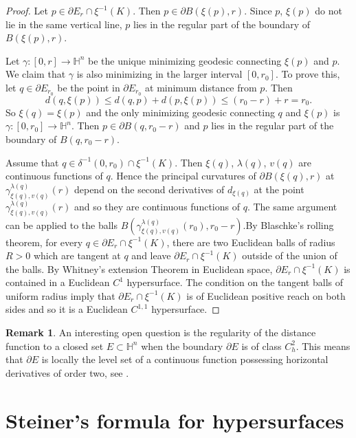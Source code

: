 \documentclass[10pt]{amsart}
\theoremstyle{definition}
\newtheorem{remark}[theorem]{Remark}
\theoremstyle{remark}
\numberwithin{equation}{section}
\begin{document}
\begin{proof}
Let $p\in{\partial} E_{r}\cap\xi^{-1}(K)$. Then $p\in{\partial} B(\xi(p),r)$. Since $p$, $\xi(p)$ do not lie in the same vertical line, $p$ lies in the regular part of the boundary of $B(\xi(p),r)$.

Let ${\gamma}:[0,r]\to{{\mathbb{H}}}^n$ be the unique minimizing geodesic connecting $\xi(p)$ and $p$. We claim that ${\gamma}$ is also minimizing in the larger interval $[0,r_{0}]$. To prove this, let $q\in {\partial} E_{r_{0}}$ be the point in ${\partial} E_{r_{0}}$ at minimum distance from $p$. Then
\[
d(q,\xi(p)){\leqslant} d(q,p)+d(p,\xi(p)){\leqslant} (r_{0}-r)+r=r_{0}.
\]
So $\xi(q)=\xi(p)$ and the only minimizing geodesic connecting $q$ and $\xi(p)$ is ${\gamma}:[0,r_{0}]\to{{\mathbb{H}}}^n$. Then $p\in{\partial} B(q,r_{0}-r)$ and $p$ lies in the regular part of the boundary of $B(q,r_{0}-r)$.

Assume that $q\in\delta^{-1}(0,r_{0})\cap\xi^{-1}(K)$.  Then $\xi(q)$, ${\lambda}(q)$, $v(q)$ are continuous functions of $q$.  Hence the principal curvatures of ${\partial} B(\xi(q),r)$ at ${\gamma}_{\xi(q),v(q)}^{{\lambda}(q)}(r)$ depend on the second derivatives of $d_{\xi(q)}$ at the point ${\gamma}_{\xi(q),v(q)}^{{\lambda}(q)}(r)$ and so they are continuous functions of $q$.  The same argument can be applied to the balls $B({\gamma}_{\xi(q),v(q)}^{{\lambda}(q)}(r_{0}),r_{0}-r)$.By Blaschke's rolling theorem, for every $q\in{\partial} E_{r}\cap\xi^{-1}(K)$, there are two Euclidean balls of radius $R>0$ which are tangent at $q$ and leave
${\partial} E_{r}\cap\xi^{-1}(K)$ outside of the union of the balls. By Whitney's extension Theorem in Euclidean space, ${\partial} E_{r}\cap\xi^{-1}(K)$ is contained in a Euclidean $C^1$ hypersurface. The condition on the tangent balls of uniform radius imply that ${\partial} E_{r}\cap\xi^{-1}(K)$ is of Euclidean positive reach on both sides and so it is a Euclidean $C^{1,1}$ hypersurface.
\end{proof}

\begin{remark}
An interesting open question is the regularity of the distance function to a closed set $E\subset{{\mathbb{H}}}^n$ when the boundary ${\partial} E$ is of class $C_h^2$. This means that ${\partial} E$ is locally the level set of a continuous function possessing horizontal derivatives of order two, see \cite{MR1871966}.
\end{remark}

\section{Steiner's formula for hypersurfaces
}
\label{sec:steiner}
\end{document}

